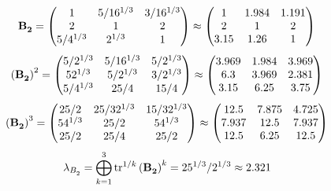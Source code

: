 \documentclass[10pt,a4paper]{article}
\begin{document}
	\[
		\bold{B_2^{}} = 
		\begin{pmatrix}
			{1}{} & {{5}} / {{16^ {1 / 3}}} & {{3}} / {{16^ {1 / 3}}} \\
			{{2}}{} & {1}{} & {{2}}{} \\
			{{5}} / {{4^ {1 / 3}}} & {{2^ {1 / 3}}}{} & {1}{} \\
		\end{pmatrix}
		\approx
		\begin{pmatrix}
			1        & 1.984    & 1.191    \\
			2        & 1        & 2        \\
			3.15     & 1.26     & 1        \\
		\end{pmatrix}
	\]
	\[
		\left(\bold{B_2^{}}\right)^{2} = 
		\begin{pmatrix}
			{{5}} / {{2^ {1 / 3}}} & {{5}} / {{16^ {1 / 3}}} & {{5}} / {{2^ {1 / 3}}} \\
			{{5}{2^ {1 / 3}}}{} & {{5}} / {{2^ {1 / 3}}} & {{3}} / {{2^ {1 / 3}}} \\
			{{5}} / {{4^ {1 / 3}}} & {{25}} / {{4}} & {{15}} / {{4}} \\
		\end{pmatrix}
		\approx
		\begin{pmatrix}
			3.969    & 1.984    & 3.969    \\
			6.3      & 3.969    & 2.381    \\
			3.15     & 6.25     & 3.75     \\
		\end{pmatrix}
	\]
	\[
		\left(\bold{B_2^{}}\right)^{3} = 
		\begin{pmatrix}
			{{25}} / {{2}} & {{25}} / {{32^ {1 / 3}}} & {{15}} / {{32^ {1 / 3}}} \\
			{{5}{4^ {1 / 3}}}{} & {{25}} / {{2}} & {{5}{4^ {1 / 3}}}{} \\
			{{25}} / {{2}} & {{25}} / {{4}} & {{25}} / {{2}} \\
		\end{pmatrix}
		\approx
		\begin{pmatrix}
			12.5     & 7.875    & 4.725    \\
			7.937    & 12.5     & 7.937    \\
			12.5     & 6.25     & 12.5     \\
		\end{pmatrix}
	\]
	\[
		\lambda_{B_2^{}} =  \bigoplus ^{3} _{k = 1} \operatorname{tr} ^{1 / k} \left( \bold{B_2^{}} \right)^k = {{25^ {1 / 3}}} / {{2^ {1 / 3}}}\approx 2.321
	\]
\end{document}
